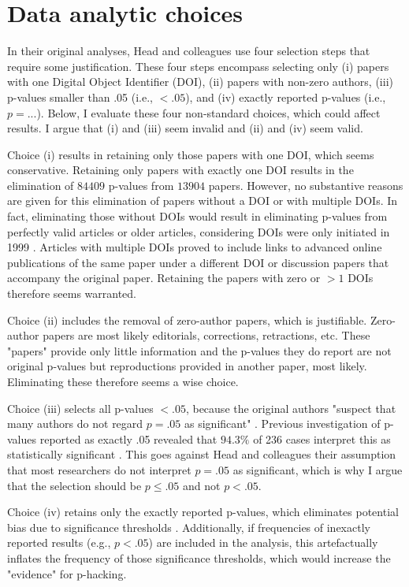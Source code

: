 \section{Data analytic choices}
In their original analyses, Head and colleagues use four selection steps that require some justification. These four steps encompass selecting only (i) papers with one Digital Object Identifier (DOI), (ii) papers with non-zero authors, (iii) p-values smaller than .05 (i.e., $<.05$), and (iv) exactly reported p-values (i.e., $p=...$). Below, I evaluate these four non-standard choices, which could affect results. I argue that (i) and (iii) seem invalid and (ii) and (iv) seem valid.

Choice (i) results in retaining only those papers with one DOI, which seems conservative. Retaining only papers with exactly one DOI results in the elimination of $84409$ p-values from $13904$ papers. However, no substantive reasons are given for this elimination of papers without a DOI or with multiple DOIs. In fact, eliminating those without DOIs would result in eliminating p-values from perfectly valid articles or older articles, considering DOIs were only initiated in 1999 \cite{Crossre2009}. Articles with multiple DOIs proved to include links to advanced online publications of the same paper under a different DOI or discussion papers that accompany the original paper. Retaining the papers with zero or $>1$ DOIs therefore seems warranted.

Choice (ii) includes the removal of zero-author papers, which is justifiable. Zero-author papers are most likely editorials, corrections, retractions, etc. These "papers" provide only little information and the p-values they do report are not original p-values but reproductions provided in another paper, most likely. Eliminating these therefore seems a wise choice.

Choice (iii) selects all p-values $<.05$, because the original authors "suspect that many authors do not regard $p=.05$ as significant" \cite{Head2015}. Previous investigation of p-values reported as exactly .05 revealed that $94.3\%$ of 236 cases interpret this as statistically significant \cite{Nuijten2015}. This goes against Head and colleagues their assumption that most researchers do not interpret $p=.05$ as significant, which is why I argue that the selection should be $p\leq.05$ and not $p<.05$.

Choice (iv) retains only the exactly reported p-values, which eliminates potential bias due to significance thresholds \cite{Ridley2007}. Additionally, if frequencies of inexactly reported results (e.g., $p<.05$) are included in the analysis, this artefactually inflates the frequency of those significance thresholds, which would increase the "evidence" for p-hacking. 
